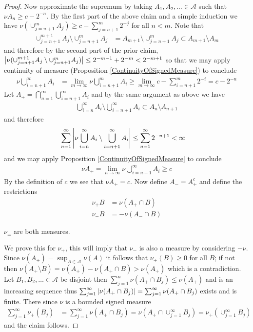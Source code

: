 \begin{proof}
Now approximate the supremum by taking $A_1, A_2, \dots \in \mathcal{A}$ such that $\nu
  A_n \geq c - 2^{-n}$.  By the first part of the above claim and a simple induction we have
$\nu(\cup_{j=n+1}^m A_j) \geq c - \sum_{j=n+1}^m 2^{-j}$ for all $n < m$.  Note that
\begin{align*}
\cup_{j=n+1}^{m+1} A_j \setminus \cup_{j=n+1}^{m} A_j &= A_{m+1} \setminus \cup_{j=n+1}^{m} A_j \subset A_{m+1} \setminus A_m
\end{align*}
and therefore by the second part of the prior claim, $\left \vert \nu(\cup_{j=n+1}^{m+1} A_j \setminus \cup_{j=n+1}^{m} A_j) \right \vert \leq 2^{-m-1} + 2^{-m} < 2^{-m+1}$
so that we may apply continuity of measure (Proposition \ref{ContinuityOfSignedMeasure}) to conclude
\begin{align*}
\nu \bigcup_{i=n+1}^\infty A_i &= \lim_{m \to \infty} \nu \bigcup_{i=n+1}^m A_i
\geq \lim_{m \to \infty} c - \sum_{i=n+1}^m 2^{-i} = c - 2^{-n}
\end{align*}
Let $A_+ = \bigcap_{n=1}^\infty \bigcup_{i=n+1}^\infty A_i$ and by the same argument as above we have
\begin{align*}
\bigcup_{i=n}^\infty A_i \setminus \bigcup_{i=n+1}^\infty A_i \subset A_n \setminus A_{n+1}
\end{align*}
and therefore 
\begin{align*}
\sum_{n=1}^\infty \left \vert  \nu \bigcup_{i=n}^\infty A_i \setminus \bigcup_{i=n+1}^\infty A_i \right \vert &\leq \sum_{n=1}^\infty 2^{-n+1} < \infty
\end{align*}
and we may apply Proposition \ref{ContinuityOfSignedMeasure} to conclude
\begin{align*} \nu A_+ = \lim_{n \to \infty} \nu
  \bigcup_{i=n+1}^\infty A_i \geq c
\end{align*}
By the definition of $c$ we see that $\nu A_+ = c$.  Now define $A_- =
A_+^c$ and define the restrictions 
\begin{align*}
\nu_+ B &= \nu (A_+ \cap B ) \\
\nu_- B &= -\nu ( A_- \cap B )
\end{align*}

\begin{clm}$\nu_\pm$ are both measures.
\end{clm}
We prove this for $\nu_+$, this will imply that $\nu_-$ is also a measure by considering $-\nu$.  Since $\nu(A_+) = \sup_{A \in \mathcal{A}} \nu(A)$ it follows that $\nu_+(B) \geq 0$ for all $B$; if not then $\nu(A_+ \setminus B) = \nu(A_+) - \nu(A_+ \cap B) > \nu(A_+)$ which is a contradiction.  Let $B_1, B_2, \dotsc \in \mathcal{A}$ be disjoint then $\sum_{j=1}^n \nu(A_+ \cap B_j) \leq \nu(A_+)$ and is an increasing sequence thus $\sum_{j=1}^\infty \left \vert \nu(A_+ \cap B_j) \right \vert = \sum_{j=1}^\infty \nu(A_+ \cap B_j)$ exists and is finite.  There since $\nu$ is a bounded signed measure
\begin{align*}
\sum_{j=1}^\infty \nu_+(B_j) &= \sum_{j=1}^\infty \nu(A_+ \cap B_j) = \nu(A_+ \cap \cup_{j=1}^\infty  B_j) = \nu_+(\cup_{j=1}^\infty  B_j)
\end{align*}
and the claim follows.  


\end{proof}
